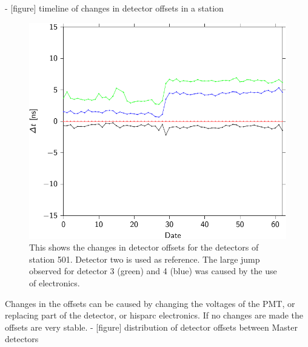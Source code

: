 - [figure] timeline of changes in detector offsets in a station

\begin{figure}
    \centering
    \includegraphics{plots/station/detector_offset_drift_month_501}
    \caption{This shows the changes in detector offsets for the detectors of station 501. Detector two is used as reference. The large jump observed for detector 3 (green) and 4 (blue) was caused by the use of \hisparciii electronics.}
    \label{fig:detector_offset_drift_month_501}
\end{figure}

  Changes in the offsets can be caused by changing the voltages of the PMT, or
  replacing part of the detector, or hisparc electronics. If no changes are
  made the offsets are very stable.
- [figure] distribution of detector offsets between Master detectors



